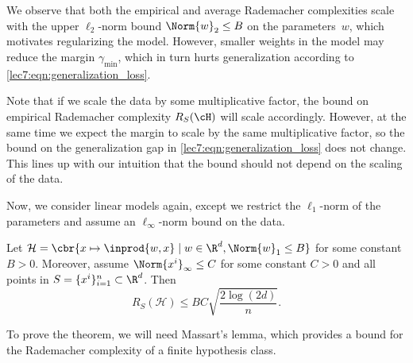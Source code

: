 We observe that both the empirical and average Rademacher complexities scale with the upper $\ell_2$-norm bound $\Norm{w}_2 \le B$ on the parameters~$w$, which motivates regularizing the model. However, smaller weights in the model may reduce the margin $\gamma_\mathrm{min}$, which in turn hurts generalization according to \eqref{lec7:eqn:generalization_loss}.

\begin{remark}
Note that if we scale the data by some multiplicative factor, the bound on empirical Rademacher complexity $R_S(\cH)$ will scale accordingly. However, at the same time we expect the margin to scale by the same multiplicative factor, so the bound on the generalization gap in \eqref{lec7:eqn:generalization_loss} does not change. This lines up with our intuition that the bound should not depend on the scaling of the data.
\end{remark}

Now, we consider linear models again, except we restrict the $\ell_1$-norm of the parameters and assume an $\ell_\infty$-norm bound on the data.

\begin{theorem}\label{lec7:thm:l1-thm}
    Let $\mathcal{H} = \cbr{x \mapsto \inprod{w,x} \mid w \in \R^d, \Norm{w}_1 \le B}$ for some constant $B > 0$. Moreover, assume $\Norm{x\sp{i}}_\infty \leq C$ for some constant $C > 0$ and all points in $S = \{x\sp{i}\}_{i=1}^n \subset \R^d$. Then
    \begin{equation}
        R_S(\mathcal{H}) \leq BC\sqrt{\frac{2\log(2d)}{n}}.
    \end{equation}
\end{theorem}

To prove the theorem, we will need Massart's lemma, which provides a bound for the Rademacher complexity of a finite hypothesis class.

